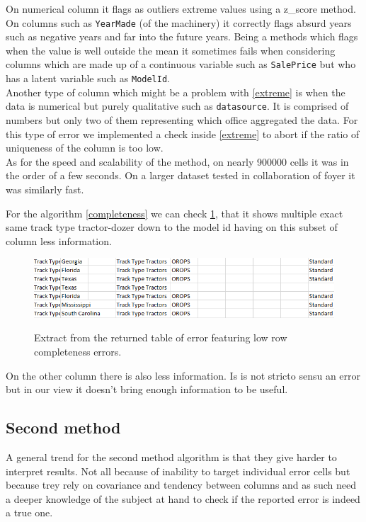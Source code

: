 \documentclass{article}
\begin{document}
On numerical column it flags as outliers extreme values using a z\_score method. On columns such as \texttt{YearMade} (of the machinery) it correctly flags absurd years such as negative years and far into the future years. Being a methods which flags when the value is well outside the mean it sometimes fails when considering columns which are made up of a continuous variable such as \texttt{SalePrice} but who has a latent variable such as \texttt{ModelId}. \\ Another type of column which might be a problem with \ref{extreme} is when the data is numerical but purely qualitative such as \texttt{datasource}. It is comprised of numbers but only two of them representing which office aggregated the data. For this type of error we implemented a check inside \ref{extreme} to abort if the ratio of uniqueness of the column is too low.\\
As for the speed and scalability of the method, on nearly 900000 cells it was in the order of a few seconds. On a larger dataset tested in collaboration of foyer it was similarly fast.

For the algorithm \ref{completeness} we can check \ref{fig:exp_completeness}, that it shows multiple exact same track type tractor-dozer down to the model id having on this subset of column less information.

\begin{figure}[h]
    \centering
    \includegraphics[width=\linewidth]{picture/exp_completeness_db.png}
    \label{fig:exp_completeness}
    \caption{Extract from the returned table of error featuring low row completeness errors.}
\end{figure}
On the other column there is also less information. Is is not stricto sensu an error but in our view it doesn't bring enough information to be useful.

\subsection{Second method}
A general trend for the second method algorithm is that they give harder to interpret results. Not all because of inability to target individual error cells but because trey rely on covariance and tendency between columns and as such need a deeper knowledge of the subject at hand to check if the reported error is indeed a true one.
\end{document}
